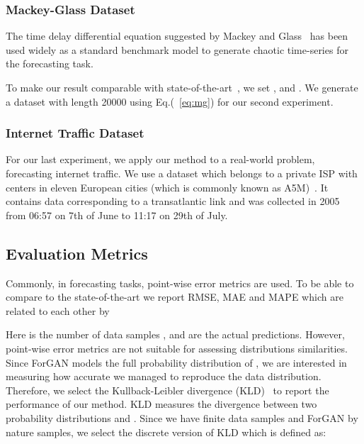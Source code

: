 \documentclass{ieeeaccess}
\begin{document}
\subsubsection{Mackey-Glass Dataset}

The time delay differential equation suggested by Mackey and Glass~\cite{mackey1977oscillation} has been used widely as a standard benchmark model to generate chaotic time-series for the forecasting task.

To make our result comparable with state-of-the-art~\cite{mendez2017competitive}, we set ,  and . We generate a dataset with length 20000 using Eq.(~\ref{eq:mg}) for our second experiment. 

\subsubsection{Internet Traffic Dataset}
For our last experiment, we apply our method to a real-world problem, forecasting internet traffic. We use a dataset which belongs to a private ISP with centers in eleven European cities (which is commonly known as A5M)~\cite{cortez2012multi}. It contains data corresponding to a transatlantic link and was collected in 2005 from 06:57 on 7th of June to 11:17 on 29th of July.

\subsection{Evaluation Metrics}

Commonly, in forecasting tasks, point-wise error metrics are used. To be able to compare to the state-of-the-art we report RMSE, MAE and MAPE which are related to each other by

Here  is the number of data samples , and  are the actual predictions. However, 
point-wise error metrics are not suitable for assessing distributions similarities. Since ForGAN models the full probability distribution of , we are interested in measuring how accurate we managed to reproduce the data distribution. Therefore, we select the Kullback-Leibler divergence (KLD)~\cite{kullback1951} to report the performance of our method. KLD measures the divergence between two probability distributions  and . Since we have finite data samples and ForGAN by nature samples, we select the discrete version of KLD which is defined as:
\end{document}
